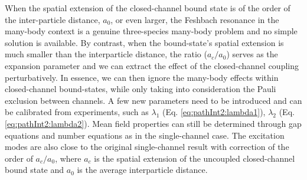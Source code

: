 When the spatial extension of  the closed-channel bound state is  of the order of the   inter-particle distance, $a_{0}$, or even larger, the Feshbach resonance in the many-body context is a genuine three-species many-body problem and no simple solution is available.  By contrast, when the bound-state's spatial extension is much smaller than the interparticle distance, the ratio ($a_{c}/a_{0}$) serves as the expansion parameter and we can extract  the effect of the closed-channel coupling perturbatively.  In essence, we can then  ignore the many-body effects within  closed-channel bound-states, while only taking into consideration  the Pauli exclusion between channels.  A few new parameters need to be introduced and can be calibrated from experiments, such as $\lambda_{1}$ (Eq. \ref{eq:pathInt2:lambda1}), $\lambda_{2}$ (Eq. \ref{eq:pathInt2:lambda2}).  Mean field properties can still be determined through gap equations and number equations as in the single-channel case.  The excitation modes are also close to the original single-channel result with correction of the order of $a_{c}/a_{0}$, where $a_{c}$ is the spatial extension of the uncoupled closed-channel  bound state and $a_{0}$ is the average interparticle distance.

